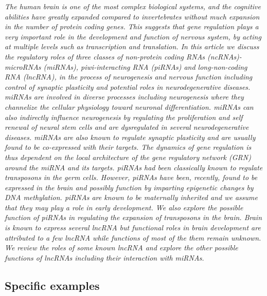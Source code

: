 \documentclass[graybox]{svmult}
\begin{document}
\cite{Iyengar2014}
\textit{The human brain is one of the most complex biological systems, and the cognitive abilities have greatly expanded compared to invertebrates without much expansion in the number of protein coding genes. This suggests that gene regulation plays a very important role in the development and function of nervous system, by acting at multiple levels such as transcription and translation. In this article we discuss the regulatory roles of three classes of non-protein coding RNAs (ncRNAs)-microRNAs (miRNAs), piwi-interacting RNA (piRNAs) and long-non-coding RNA (lncRNA), in the process of neurogenesis and nervous function including control of synaptic plasticity and potential roles in neurodegenerative diseases. miRNAs are involved in diverse processes including neurogenesis where they channelize the cellular physiology toward neuronal differentiation. miRNAs can also indirectly influence neurogenesis by regulating the proliferation and self renewal of neural stem cells and are dysregulated in several neurodegenerative diseases. miRNAs are also known to regulate synaptic plasticity and are usually found to be co-expressed with their targets. The dynamics of gene regulation is thus dependent on the local architecture of the gene regulatory network (GRN) around the miRNA and its targets. piRNAs had been classically known to regulate transposons in the germ cells. However, piRNAs have been, recently, found to be expressed in the brain and possibly function by imparting epigenetic changes by DNA methylation. piRNAs are known to be maternally inherited and we assume that they may play a role in early development. We also explore the possible function of piRNAs in regulating the expansion of transposons in the brain. Brain is known to express several lncRNA but functional roles in brain development are attributed to a few lncRNA while functions of most of the them remain unknown. We review the roles of some known lncRNA and explore the other possible functions of lncRNAs including their interaction with miRNAs.}

\subsection{Specific examples} 
\end{document}
